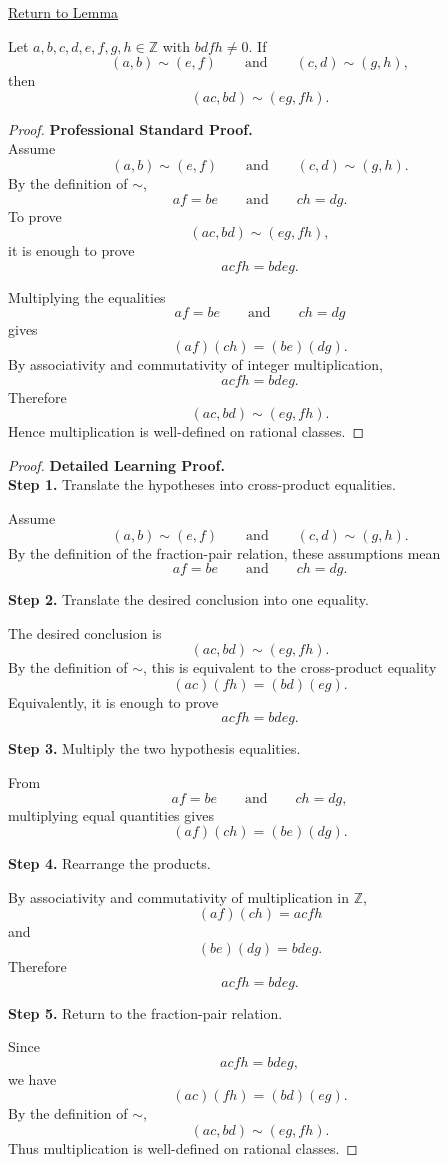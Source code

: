 \newpage
{}
\label{prf:rational-multiplication-well-defined}

\begin{remark*}[Return]
\hyperref[lem:rational-multiplication-well-defined]{Return to Lemma}
\end{remark*}

\begin{lemma*}
Let $a,b,c,d,e,f,g,h\in\mathbb{Z}$ with $bdfh\neq 0$. If
\[
(a,b)\sim(e,f)
\qquad\text{and}\qquad
(c,d)\sim(g,h),
\]
then
\[
(ac,bd)\sim(eg,fh).
\]
\end{lemma*}

\begin{proof}
\textbf{Professional Standard Proof.}~\\
Assume
\[
(a,b)\sim(e,f)
\qquad\text{and}\qquad
(c,d)\sim(g,h).
\]
By the definition of $\sim$,
\[
af=be
\qquad\text{and}\qquad
ch=dg.
\]
To prove
\[
(ac,bd)\sim(eg,fh),
\]
it is enough to prove
\[
acfh=bdeg.
\]

Multiplying the equalities
\[
af=be
\qquad\text{and}\qquad
ch=dg
\]
gives
\[
(af)(ch)=(be)(dg).
\]
By associativity and commutativity of integer multiplication,
\[
acfh=bdeg.
\]
Therefore
\[
(ac,bd)\sim(eg,fh).
\]
Hence multiplication is well-defined on rational classes.
\end{proof}

\begin{proof}
\textbf{Detailed Learning Proof.}~\\

\textbf{Step 1.} Translate the hypotheses into cross-product equalities.

Assume
\[
(a,b)\sim(e,f)
\qquad\text{and}\qquad
(c,d)\sim(g,h).
\]
By the definition of the fraction-pair relation, these assumptions mean
\[
af=be
\qquad\text{and}\qquad
ch=dg.
\]

\textbf{Step 2.} Translate the desired conclusion into one equality.

The desired conclusion is
\[
(ac,bd)\sim(eg,fh).
\]
By the definition of $\sim$, this is equivalent to the cross-product equality
\[
(ac)(fh)=(bd)(eg).
\]
Equivalently, it is enough to prove
\[
acfh=bdeg.
\]

\textbf{Step 3.} Multiply the two hypothesis equalities.

From
\[
af=be
\qquad\text{and}\qquad
ch=dg,
\]
multiplying equal quantities gives
\[
(af)(ch)=(be)(dg).
\]

\textbf{Step 4.} Rearrange the products.

By associativity and commutativity of multiplication in $\mathbb{Z}$,
\[
(af)(ch)=acfh
\]
and
\[
(be)(dg)=bdeg.
\]
Therefore
\[
acfh=bdeg.
\]

\textbf{Step 5.} Return to the fraction-pair relation.

Since
\[
acfh=bdeg,
\]
we have
\[
(ac)(fh)=(bd)(eg).
\]
By the definition of $\sim$,
\[
(ac,bd)\sim(eg,fh).
\]
Thus multiplication is well-defined on rational classes.
\end{proof}

